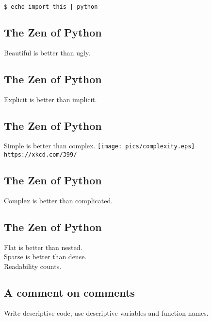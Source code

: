 \documentclass[xga]{xdvislides}
\begin{document}
\begin{verbatim}
$ echo import this | python
\end{verbatim}

\subsection{The Zen of Python}
\Huge
\begin{center}
Beautiful is better than ugly.
\end{center}

\subsection{The Zen of Python}
\begin{center}
Explicit is better than implicit.
\end{center}

\subsection{The Zen of Python}
\begin{center}
    Simple is better than complex.
\vspace*{\fill}
	\texttt{[image: pics/complexity.eps]}
	\\
	\small \verb+https://xkcd.com/399/+
\end{center}
\vspace*{\fill}
\Huge

\subsection{The Zen of Python}
\begin{center}
    Complex is better than complicated.
\end{center}

\subsection{The Zen of Python}
\begin{center}
    Flat is better than nested. \\
    Sparse is better than dense. \\
\vspace{.5in}
    Readability counts.
\end{center}

\subsection{A comment on comments}
Write descriptive code, use descriptive variables and
function names. \\
\vspace{1in}
\end{document}
